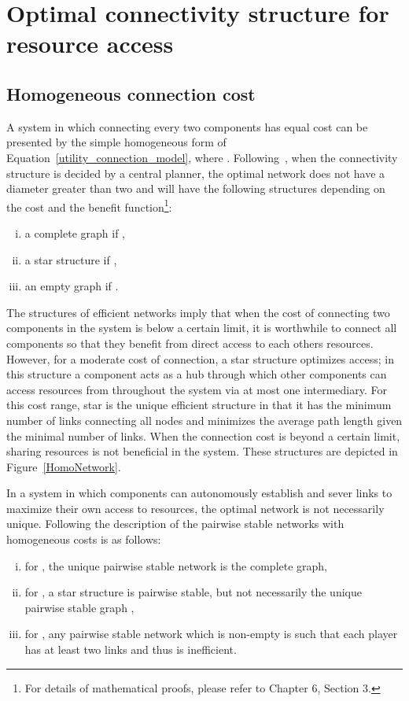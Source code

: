 \documentclass[journal,onecolumn]{IEEEtran}
\theoremstyle{plain}
\begin{document}
\section{Optimal connectivity structure for resource access}
\label{OptimalConnectivity}
\subsection{Homogeneous connection cost}

A system in which connecting every two components has equal cost can be presented by the simple homogeneous form of Equation~\ref{utility_connection_model}, where . Following~\cite{bloch2007formation}, when the connectivity structure is decided by a central planner, the optimal network does not have a diameter greater than two and will have the following structures depending on the cost and the benefit function\footnote{For details of mathematical proofs, please refer to \cite{jackson2008social} Chapter 6, Section 3.}: 
\begin{enumerate}[(i)]
\item a complete graph if ,
\item a star structure if ,
\item an empty graph if .
\end{enumerate}
The structures of efficient networks imply that when the cost of connecting two components in the system is below a certain limit, it is worthwhile to connect all components so that they benefit from direct access to each others resources. However, for a moderate cost of connection, a star structure optimizes access; in this structure a component acts as a hub through which other components can access resources from throughout the system via at most one intermediary. For this cost range, star is the unique efficient structure in that it has the minimum number of links connecting all nodes and minimizes the average path length given the minimal number of links. When the connection cost is beyond a certain limit, sharing resources is not beneficial in the system. These structures are depicted in Figure~\ref{HomoNetwork}.


In a system in which components can autonomously establish and sever links to maximize their own access to resources, the optimal network is not necessarily unique. Following \cite{bloch2007formation} the description of the pairwise stable networks with homogeneous costs is as follows:

\begin{enumerate}[(i)]
\item for , the unique pairwise stable network is the complete graph,
\item for , a star structure is pairwise stable, but not necessarily the unique pairwise stable graph ,
\item for , any pairwise stable network which is non-empty is such that each player has at least two links and thus is inefficient.
\end{enumerate}
\end{document}
